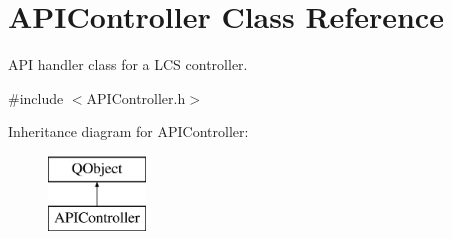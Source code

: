 \hypertarget{class_a_p_i_controller}{}\section{A\+P\+I\+Controller Class Reference}
\label{class_a_p_i_controller}


A\+PI handler class for a L\+CS controller.  




{\ttfamily \#include $<$A\+P\+I\+Controller.\+h$>$}

Inheritance diagram for A\+P\+I\+Controller\+:\begin{figure}[H]
\begin{center}
\leavevmode
\includegraphics[height=2.000000cm]{class_a_p_i_controller}
\end{center}
\end{figure}
